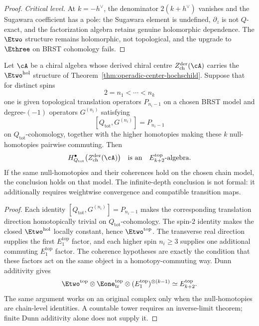 \begin{proof}
\emph{Critical level.}
At $k = -h^\vee$, the denominator
$2(k + h^\vee)$ vanishes and the Sugawara coefficient has a pole:
the Sugawara element is undefined,
$\partial_z$ is not $Q$-exact, and the factorization algebra
retains genuine holomorphic dependence. The $\Etwo$ structure
remains holomorphic, not topological, and the upgrade
to~$\Ethree$ on BRST cohomology fails.
\end{proof}

\begin{theorem}
\label{thm:e-infinity-topologization}
\ClaimStatusConditional
{}
Let $\cA$ be a chiral algebra whose derived chiral centre
$Z^{\mathrm{der}}_{\mathrm{ch}}(\cA)$ carries the
$\Etwo^{\mathrm{hol}}$ structure of
Theorem~\ref{thm:operadic-center-hochschild}. Suppose that for
distinct spins
\[
2 = n_1 < \cdots < n_k
\]
one is given topological translation operators
$P_{n_i-1}$ on a chosen BRST model and degree-$(-1)$ operators
$G^{(n_i)}$ satisfying
\[
[Q_{\mathrm{tot}},G^{(n_i)}]=P_{n_i-1}
\]
on $Q_{\mathrm{tot}}$-cohomology, together with the higher
homotopies making these $k$ null-homotopies pairwise commuting.
Then
\[
H^\bullet_{Q_{\mathrm{tot}}}
\bigl(Z^{\mathrm{der}}_{\mathrm{ch}}(\cA)\bigr)
\quad\text{is an}\quad
E_{k+2}^{\mathrm{top}}\text{-algebra}.
\]
If the same null-homotopies and their coherences hold on the
chosen chain model, the conclusion holds on that model. The
infinite-depth conclusion is not formal: it additionally requires
weightwise convergence and compatible transition maps.
\end{theorem}

\begin{proof}
Each identity $[Q_{\mathrm{tot}},G^{(n_i)}]=P_{n_i-1}$ makes the
corresponding translation direction homotopically trivial on
$Q_{\mathrm{tot}}$-cohomology. The spin-$2$ identity makes the
closed $\Etwo^{\mathrm{hol}}$ locally constant, hence
$\Etwo^{\mathrm{top}}$. The transverse real direction supplies the
first $E_1^{\mathrm{top}}$ factor, and each higher spin
$n_i\ge 3$ supplies one additional commuting $E_1^{\mathrm{top}}$
factor. The coherence hypotheses are exactly the condition that
these factors act on the same object in a homotopy-commuting way.
Dunn additivity gives
\[
\Etwo^{\mathrm{top}}
\otimes
\Eone^{\mathrm{top}}_{\mathrm{tr}}
\otimes
(E_1^{\mathrm{top}})^{\otimes (k-1)}
\simeq
E_{k+2}^{\mathrm{top}}.
\]
The same argument works on an original complex only when the
null-homotopies are chain-level identities. A countable tower
requires an inverse-limit theorem; finite Dunn additivity alone
does not supply it.
\end{proof}

